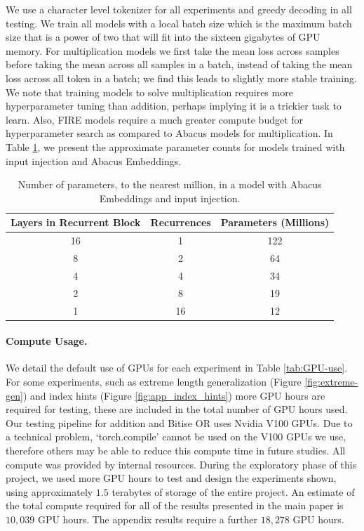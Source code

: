 \documentclass{article}
\newcommand{\sean}[1]{{\textcolor{orange}{Sean: \footnotesize\sf[#1]}}}
\begin{document}
We use a character level tokenizer for all experiments and greedy decoding in all testing.
We train all models with a local batch size which is the maximum batch size that is a power of two that will fit into the sixteen gigabytes of GPU memory.
For multiplication models we first take the mean loss across samples before taking the mean across all samples in a batch, instead of taking the mean loss across all token in a batch; we find this leads to slightly more stable training.
We note that training models to solve multiplication requires more hyperparameter tuning than addition, perhaps implying it is a trickier task to learn.
Also, FIRE models require a much greater compute budget for hyperparameter search as compared to Abacus models for multiplication.
In Table \ref{tab:param_count}, we present the approximate parameter counts for models trained with input injection and Abacus Embeddings.

\begin{table}
    \centering
    \caption{Number of parameters, to the nearest million, in a model with Abacus Embeddings and input injection.}
    \begin{tabular}{ccc} 
    \toprule
         Layers in Recurrent Block & Recurrences &  Parameters (Millions)\\ 
         \midrule
         16&  1& 122\\ 
         8&  2& 64\\ 
         4&  4& 34\\ 
         2&  8& 19\\ 
         1&  16& 12\\
         \bottomrule
    \end{tabular}
    \label{tab:param_count}
\end{table}


\paragraph{Compute Usage.}
We detail the default use of GPUs for each experiment in Table \ref{tab:GPU-use}.
For some experiments, such as extreme length generalization (Figure \ref{fig:extreme-gen}) and index hints (Figure \ref{fig:app_index_hints}) more GPU hours are required for testing, these are included in the total number of GPU hours used.
Our testing pipeline for addition and Bitise OR uses Nvidia V100 GPUs.
Due to a technical problem, `torch.compile' cannot be used on the V100 GPUs we use, therefore others may be able to reduce this compute time in future studies.
All compute was provided by internal resources.
During the exploratory phase of this project, we used more GPU hours to test and design the experiments shown, using approximately \(1.5\) terabytes of storage of the entire project.
An estimate of the total compute required for all of the results presented in the main paper is \(10,039\) GPU hours.
The appendix results require a further \(18,278\) GPU hours.
\end{document}
